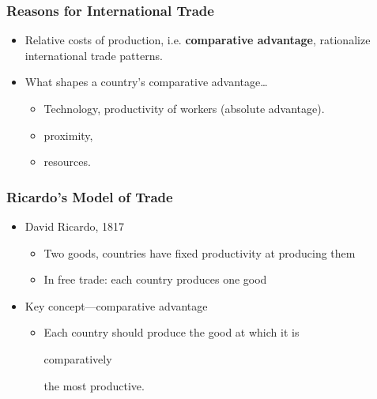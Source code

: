 \documentclass[handout]{beamer}
\begin{document}

\begin{frame}[t]
\frametitle{Reasons for International Trade}
\begin{itemize}
\bigskip
\item Relative costs of production, i.e. \textbf{comparative advantage}, rationalize international trade patterns.
\bigskip
\item What shapes a country's comparative advantage\ldots
\begin{itemize}
\bigskip
\item Technology, productivity of workers (absolute advantage).
\bigskip
\item proximity,
\bigskip
\item resources.
\end{itemize}
\end{itemize}
\bigskip
\end{frame}


\begin{frame}[t]
\frametitle{Ricardo's Model of Trade}
\bigskip
\begin{itemize}
\item David Ricardo, 1817
\begin{itemize}
\medskip
\item Two goods, countries have fixed productivity at producing them
\medskip
\item In free trade: each country produces one good
\end{itemize}
\bigskip
\item Key concept---comparative advantage
\begin{itemize}
\medskip
\item Each country should produce the good at which it is \begin{alertenv}{comparatively}\end{alertenv} the most productive.
\medskip
\end{itemize}
\end{itemize}
\bigskip
\end{frame}

\end{document}
